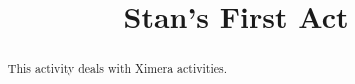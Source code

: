 \documentclass{ximera}
\title{Stan's First Act}
\begin{document}
\begin{abstract}
This activity deals with Ximera activities.
\end{abstract}
\maketitle
\end{document}

